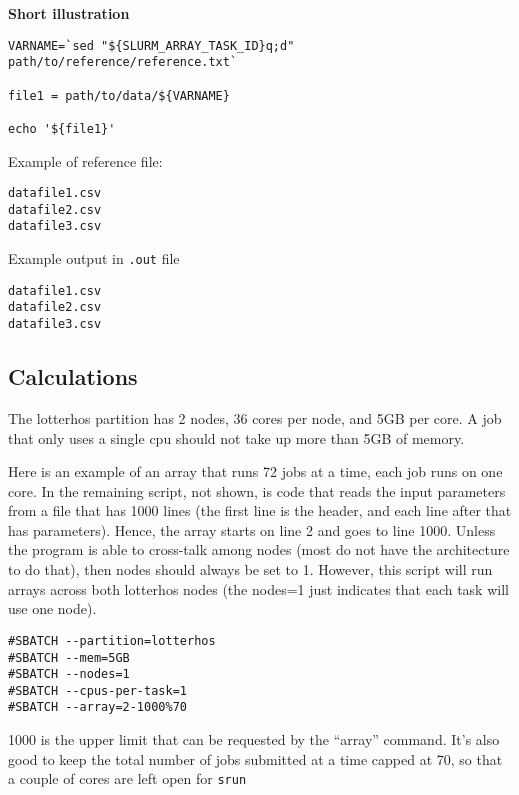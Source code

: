 \documentclass[
  letterpaper,
  DIV=11,
  numbers=noendperiod]{scrreprt}
\begin{document}
\textbf{Short illustration}

\begin{verbatim}
VARNAME=`sed "${SLURM_ARRAY_TASK_ID}q;d" path/to/reference/reference.txt`

file1 = path/to/data/${VARNAME}

echo '${file1}'
\end{verbatim}

Example of reference file:

\begin{verbatim}
datafile1.csv
datafile2.csv
datafile3.csv
\end{verbatim}

Example output in \texttt{.out} file

\begin{verbatim}
datafile1.csv
datafile2.csv
datafile3.csv
\end{verbatim}

\hypertarget{calculations}{%
\subsection*{\texorpdfstring{\textbf{Calculations}}{Calculations}}\label{calculations}}

The lotterhos partition has 2 nodes, 36 cores per node, and 5GB per
core. A job that only uses a single cpu should not take up more than 5GB
of memory.

Here is an example of an array that runs 72 jobs at a time, each job
runs on one core. In the remaining script, not shown, is code that reads
the input parameters from a file that has 1000 lines (the first line is
the header, and each line after that has parameters). Hence, the array
starts on line 2 and goes to line 1000. Unless the program is able to
cross-talk among nodes (most do not have the architecture to do that),
then nodes should always be set to 1. However, this script will run
arrays across both lotterhos nodes (the nodes=1 just indicates that each
task will use one node).

\begin{verbatim}
#SBATCH --partition=lotterhos
#SBATCH --mem=5GB
#SBATCH --nodes=1
#SBATCH --cpus-per-task=1
#SBATCH --array=2-1000%70
\end{verbatim}

1000 is the upper limit that can be requested by the ``array'' command.
It's also good to keep the total number of jobs submitted at a time
capped at 70, so that a couple of cores are left open for \texttt{srun}
\end{document}
